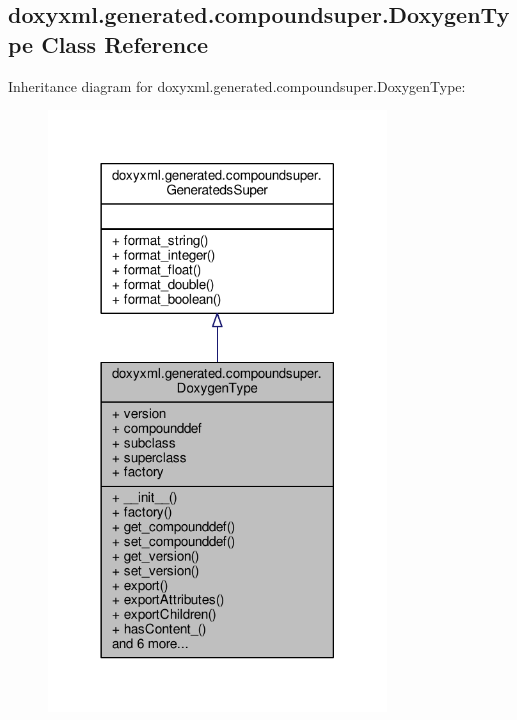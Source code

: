 \subsection{doxyxml.\+generated.\+compoundsuper.\+Doxygen\+Type Class Reference}
\label{classdoxyxml_1_1generated_1_1compoundsuper_1_1DoxygenType}


Inheritance diagram for doxyxml.\+generated.\+compoundsuper.\+Doxygen\+Type\+:
\nopagebreak
\begin{figure}[H]
\begin{center}
\leavevmode
\includegraphics[width=254pt]{dd/dfe/classdoxyxml_1_1generated_1_1compoundsuper_1_1DoxygenType__inherit__graph}
\end{center}
\end{figure}


